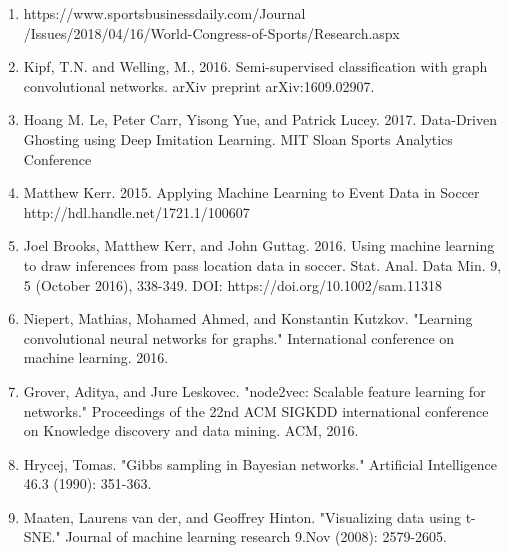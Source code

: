 \begin{enumerate}

\item https://www.sportsbusinessdaily.com/Journal\\
/Issues/2018/04/16/World-Congress-of-Sports/Research.aspx 

\item Kipf, T.N. and Welling, M., 2016. Semi-supervised classification with graph convolutional networks. arXiv preprint         arXiv:1609.02907.

\item Hoang M. Le, Peter Carr, Yisong Yue, and Patrick Lucey. 2017. Data-Driven Ghosting using Deep Imitation Learning. MIT Sloan Sports Analytics Conference

\item Matthew Kerr. 2015. Applying Machine Learning to Event Data in Soccer    http://hdl.handle.net/1721.1/100607

\item Joel Brooks, Matthew Kerr, and John Guttag. 2016. Using machine learning to draw inferences from pass location data in soccer. Stat. Anal. Data Min. 9, 5 (October 2016), 338-349. DOI: https://doi.org/10.1002/sam.11318 

\item Niepert, Mathias, Mohamed Ahmed, and Konstantin Kutzkov. "Learning convolutional neural networks for graphs." International conference on machine learning. 2016.

\item Grover, Aditya, and Jure Leskovec. "node2vec: Scalable feature learning for networks." Proceedings of the 22nd ACM SIGKDD international conference on Knowledge discovery and data mining. ACM, 2016.

\item Hrycej, Tomas. "Gibbs sampling in Bayesian networks." Artificial Intelligence 46.3 (1990): 351-363.

\item Maaten, Laurens van der, and Geoffrey Hinton. "Visualizing data using t-SNE." Journal of machine learning research 9.Nov (2008): 2579-2605.



\end{enumerate}
